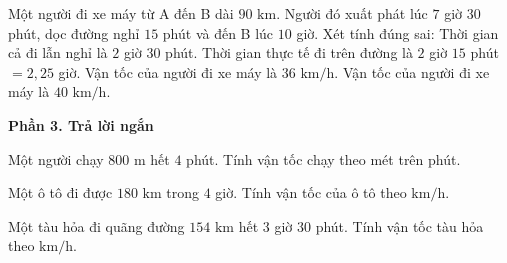 \begin{ex} %
Một người đi xe máy từ A đến B dài $90\text{ km}$. Người đó xuất phát lúc $7$ giờ $30$ phút, dọc đường nghỉ $15$ phút và đến B lúc $10$ giờ. Xét tính đúng sai:
\choiceTF
{\True Thời gian cả đi lẫn nghỉ là $2$ giờ $30$ phút.}
{\True Thời gian thực tế đi trên đường là $2$ giờ $15$ phút $= 2{,}25$ giờ.}
{Vận tốc của người đi xe máy là $36\text{ km/h}$.}
{\True Vận tốc của người đi xe máy là $40\text{ km/h}$.}
\end{ex}

\textbf{Phần 3. Trả lời ngắn}

\begin{ex} %
Một người chạy $800\text{ m}$ hết $4$ phút. Tính vận tốc chạy theo mét trên phút.
\end{ex}

\begin{ex} %
Một ô tô đi được $180\text{ km}$ trong $4$ giờ. Tính vận tốc của ô tô theo $\text{km/h}$.
\end{ex}

\begin{ex} %
Một tàu hỏa đi quãng đường $154\text{ km}$ hết $3$ giờ $30$ phút. Tính vận tốc tàu hỏa theo $\text{km/h}$.
\end{ex}

